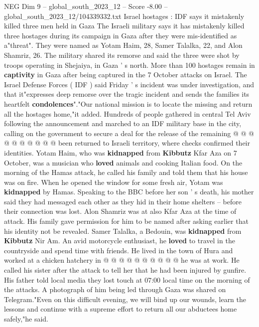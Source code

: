 \begin{textsample}{NEG Dim 9 – global\_south\_2023\_12 – Score -8.00 – global\_south\_2023\_12/104339332.txt}  \label{ex:f9_neg_302}
Israel hostages : IDF says it mistakenly killed three men held in Gaza The Israeli military says it has mistakenly killed three hostages during its campaign in Gaza after they were mis-identified as a"threat".
They were named as Yotam Haim, 28, Samer Talalka, 22, and Alon Shamriz, 26.
The military shared its remorse and said the three were shot by troops operating in Shejaiya, in Gaza ' s north.
More than 100 hostages remain in \textbf{captivity} in Gaza after being captured in the 7 October attacks on Israel.
The Israel Defense Forces ( IDF ) said Friday ' s incident was under investigation, and that it"expresses deep remorse over the tragic incident and sends the families its heartfelt \textbf{condolences}"."Our national mission is to locate the missing and return all the hostages home,"it added.
Hundreds of people gathered in central Tel Aviv following the announcement and marched to an IDF military base in the city, calling on the government to secure a deal for the release of the remaining @ @ @ @ @ @ @ @ @ @ been returned to Israeli territory, where checks confirmed their identities.
Yotam Haim, who was \textbf{kidnapped} from \textbf{Kibbutz} Kfar Aza on 7 October, was a musician who \textbf{loved} animals and cooking Italian food.
On the morning of the Hamas attack, he called his family and told them that his house was on fire.
When he opened the window for some fresh air, Yotam was \textbf{kidnapped} by Hamas.
Speaking to the BBC before her son ' s death, his mother said they had messaged each other as they hid in their home shelters -- before their connection was lost.
Alon Shamriz was at also Kfar Aza at the time of attack.
His family gave permission for him to be named after asking earlier that his identity not be revealed.
Samer Talalka, a Bedouin, was \textbf{kidnapped} from \textbf{Kibbutz} Nir Am.
An avid motorcycle enthusiast, he \textbf{loved} to travel in the countryside and spend time with friends.
He lived in the town of Hura and worked at a chicken hatchery in @ @ @ @ @ @ @ @ @ @ he was at work.
He called his sister after the attack to tell her that he had been injured by gunfire.
His father told local media they lost touch at 07:00 local time on the morning of the attacks.
A photograph of him being led through Gaza was shared on Telegram."Even on this difficult evening, we will bind up our wounds, learn the lessons and continue with a supreme effort to return all our abductees home safely,"he said.

\end{textsample}
